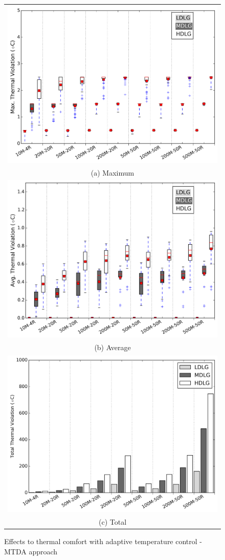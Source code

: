 \begin{figure}
\centering
\begin{tabular}{c}
  \includegraphics[width=0.6\linewidth]{figs/max_thermal_violation_diff_temp_flex_def_vs_oarb_boxplot_mtd.png} \\
(a) Maximum \\[6pt]
  \includegraphics[width=0.6\linewidth]{figs/avg_thermal_violation_diff_temp_flex_def_vs_oarb_boxplot_mtd.png} \\
(b) Average \\[6pt]
	\includegraphics[width=0.6\linewidth]{figs/total_thermal_violation_diff_temp_flex_def_vs_oarb_mtd.png} \\
(c) Total 
\end{tabular}
\caption{Effects to thermal comfort with adaptive temperature control - MTDA approach}
\label{fig:atc_mt}
\end{figure}

